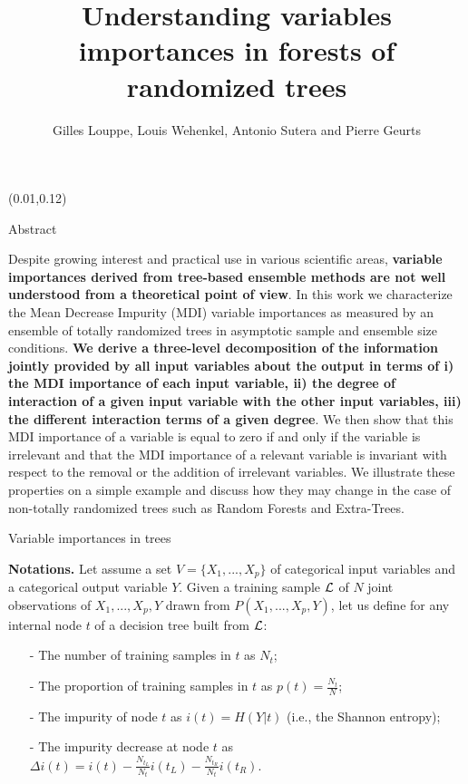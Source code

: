 \documentclass[final]{beamer}
\title{Understanding variables importances in forests of randomized trees}
\author{Gilles Louppe, Louis Wehenkel, Antonio Sutera and Pierre Geurts}
\date{}
\begin{document}
\begin{frame}{}



\begin{textblock}{0.32}(0.01,0.12)


\begin{block}{Abstract \phantom{p}}

Despite growing interest and practical use in various scientific areas, \textbf{variable
importances derived from tree-based ensemble methods are not well understood
from a theoretical point of view}. In this work we characterize the Mean Decrease
Impurity (MDI) variable importances as measured by an ensemble of totally
randomized trees in asymptotic sample and ensemble size conditions. \textbf{We derive a
three-level decomposition of the  information jointly provided by all input
variables about the output in terms of {\color{lightgreen}i) the MDI importance of each input
variable}, {\color{lightblue}ii) the degree of interaction of a given input variable with the other
input variables}, {\color{lightred}iii) the different interaction terms of a given degree}}. We then
show that this MDI importance of a variable is equal to zero if and only if the
variable is irrelevant and that the MDI importance of a relevant variable is
invariant with respect to the removal or the addition of irrelevant variables.
We illustrate these properties on a simple example and discuss how they may
change in the case of  non-totally randomized trees such as Random Forests and
Extra-Trees.

\end{block}

\vspace{0.5cm}
\begin{block}{Variable importances in trees \phantom{p}}

\textbf{Notations.} Let assume a set $V = \{X_1, ..., X_p\}$ of categorical input variables and a categorical output variable $Y$. Given a training sample ${\cal L}$ of $N$ joint observations of $X_1, ..., X_p, Y$ drawn from $P(X_1, ..., X_p, Y)$,
let us define for any internal node $t$ of a decision tree built from ${\cal L}$:
\begin{itemize}
\item[-] The number of training samples in $t$ as $N_t$;
\item[-] The proportion of training samples in $t$ as $p(t) = \frac{N_t}{N}$;
\item[-] The impurity of node $t$ as $i(t) = H(Y|t)$ (i.e., the Shannon entropy);
\item[-] The impurity decrease at node $t$ as $\Delta i(t) = i(t) - \frac{N_{t_L}}{N_t} i(t_L) - \frac{N_{t_R}}{N_t} i(t_R)$.
\end{itemize}


\end{block}
\end{textblock}
\end{frame}
\end{document}
